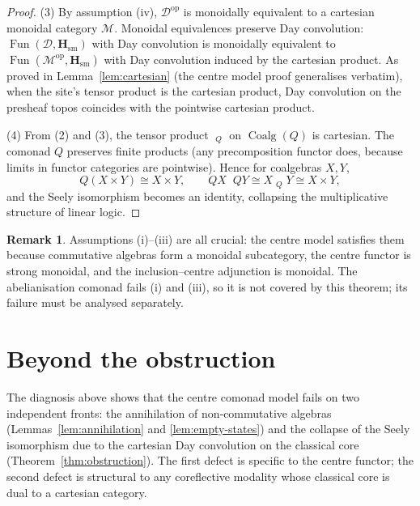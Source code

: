 \documentclass[12pt,a4paper]{article}
\theoremstyle{plain}
\theoremstyle{definition}
\newtheorem{remark}[theorem]{Remark}
\DeclareMathOperator{\Coalg}{Coalg}
\DeclareMathOperator{\Fun}{Fun}
\DeclareMathOperator{\Day}{\otimes_{\mathrm{Day}}}
\begin{document}
\begin{proof}
(3) By assumption (iv), $\mathcal{D}^{\mathrm{op}}$ is monoidally equivalent to a cartesian monoidal category $\mathcal{M}$.  Monoidal equivalences preserve Day convolution: $\Fun(\mathcal{D},\mathbf{H}_{\mathrm{sm}})$ with Day convolution is monoidally equivalent to $\Fun(\mathcal{M}^{\mathrm{op}},\mathbf{H}_{\mathrm{sm}})$ with Day convolution induced by the cartesian product.  As proved in Lemma~\ref{lem:cartesian} (the centre model proof generalises verbatim), when the site's tensor product is the cartesian product, Day convolution on the presheaf topos coincides with the pointwise cartesian product.

(4) From (2) and (3), the tensor product $\Day_Q$ on $\Coalg(Q)$ is cartesian.  The comonad $Q$ preserves finite products (any precomposition functor does, because limits in functor categories are pointwise).  Hence for coalgebras $X,Y$,
\[
Q(X\times Y)\cong X\times Y,\qquad
QX \Day QY \cong X \Day_Q Y \cong X\times Y,
\]
and the Seely isomorphism becomes an identity, collapsing the multiplicative structure of linear logic.
\end{proof}

\begin{remark}
Assumptions (i)--(iii) are all crucial: the centre model satisfies them because commutative algebras form a monoidal subcategory, the centre functor is strong monoidal, and the inclusion--centre adjunction is monoidal.  The abelianisation comonad fails (i) and (iii), so it is not covered by this theorem; its failure must be analysed separately.
\end{remark}

\section{Beyond the obstruction}
\label{sec:beyond}

The diagnosis above shows that the centre comonad model fails on two independent fronts: the annihilation of non‑commutative algebras (Lemmas~\ref{lem:annihilation} and \ref{lem:empty-states}) and the collapse of the Seely isomorphism due to the cartesian Day convolution on the classical core (Theorem~\ref{thm:obstruction}).  The first defect is specific to the centre functor; the second defect is structural to any coreflective modality whose classical core is dual to a cartesian category.
\end{document}
